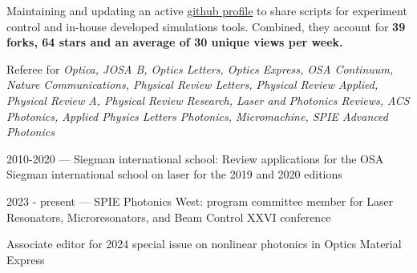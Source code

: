 \documentclass[11pt, a4paper]{customcv}
\begin{document}
%
{
    {
      \begin{cvitems} %
            \item {Maintaining and updating an active \href{https://github.com/gregmoille}{github profile}} to share scripts for experiment control and in-house developed simulations tools. Combined, they account for \textbf{39 forks, 64 stars and an average of 30 unique views per week. }
      \end{cvitems}
    }
    \vspace{1ex}
    {
      \begin{cvitems} %
            \item {Referee for \textit{Optica, JOSA B, Optics Letters, Optics Express, OSA Continuum, Nature Communications, Physical Review Letters, Physical Review Applied, Physical Review A, Physical Review Research, Laser and Photonics Reviews,  ACS Photonics, Applied Physics Letters Photonics, Micromachine, SPIE Advanced Photonics}}
      \end{cvitems}
    }
    \vspace{1ex}
    {
      \begin{cvitems} %
            \item {2010-2020 --- Siegman international school: Review applications for the OSA Siegman international school on laser for the 2019 and 2020 editions}
            \item {2023 - present --- SPIE Photonics West: program committee member for Laser Resonators, Microresonators, and Beam Control XXVI conference}
            \item Associate editor for 2024 special issue on nonlinear photonics in Optics Material Express 
      \end{cvitems}
    }
}
\end{document}
